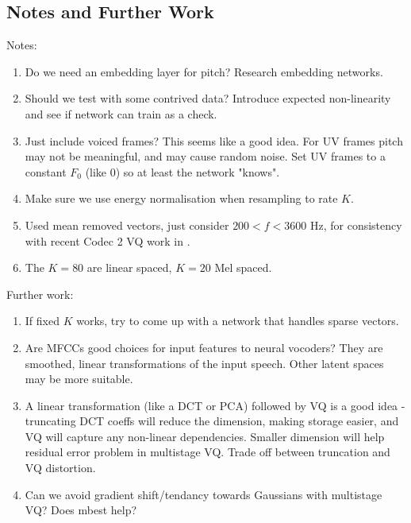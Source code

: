 \documentclass{article}
\begin{document}
\subsection{Notes and Further Work}

Notes:
\begin{enumerate}
\item Do we need an embedding layer for pitch?  Research embedding networks.
\item Should we test with some contrived data?  Introduce expected non-linearity and see if network can train as a check.
\item Just include voiced frames?  This seems like a good idea.  For UV frames pitch may not be meaningful, and may cause random noise. Set UV frames to a constant $F_0$ (like 0) so at least the network "knows".
\item Make sure we use energy normalisation \cite{rowe2023_ratek_study} when resampling to rate $K$.
\item Used mean removed vectors, just consider $200 < f < 3600$ Hz, for consistency with recent Codec 2 VQ work in \cite{rowe2023_ratek_study}.
\item The $K=80$ are linear spaced, $K=20$ Mel spaced.
\end{enumerate}

Further work:
\begin{enumerate}
\item If fixed $K$ works, try to come up with a network that handles sparse vectors.
\item Are MFCCs good choices for input features to neural vocoders? They are smoothed, linear transformations of the input speech.  Other latent spaces may be more suitable.
\item A linear transformation (like a DCT or PCA) followed by VQ is a good idea - truncating DCT coeffs will reduce the dimension, making storage easier, and VQ will capture any non-linear dependencies.  Smaller dimension will help residual error problem in multistage VQ. Trade off between truncation and VQ distortion.
\item Can we avoid gradient shift/tendancy towards Gaussians with multistage VQ?  Does mbest help?
\end{enumerate}



\end{document}
